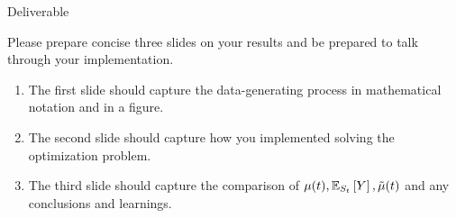 \documentclass{article}
\theoremstyle{definition}
\theoremstyle{plain}
\newtheorem{lemm}[prop]{Lemma}
\theoremstyle{remark}
\begin{document}
\begin{section}{Deliverable}

Please prepare concise three slides on your results and be prepared to talk through your implementation.
\begin{enumerate}
  \item The first slide should capture the data-generating process in mathematical notation and in a figure.
  \item The second slide should capture how you implemented solving the optimization problem.
  \item The third slide should capture the comparison of $\mu(t), \EE[S_{t}]{Y}, \tilde{\mu}(t)$ and any conclusions and learnings.
\end{enumerate}

\end{section}








\end{document}
